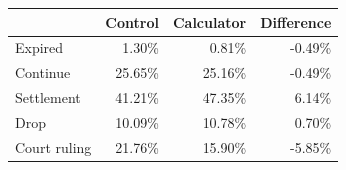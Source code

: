 \begin{tabular}{l|rrr}
\toprule
      & \multicolumn{1}{l}{Control} & \multicolumn{1}{l}{Calculator} & \multicolumn{1}{l}{Difference} \\
\midrule
Expired & 1.30\% & 0.81\% & -0.49\% \\
Continue & 25.65\% & 25.16\% & -0.49\% \\
Settlement & 41.21\% & 47.35\% & 6.14\% \\
Drop  & 10.09\% & 10.78\% & 0.70\% \\
Court ruling & 21.76\% & 15.90\% & -5.85\% \\
\bottomrule
\bottomrule
\end{tabular}%
